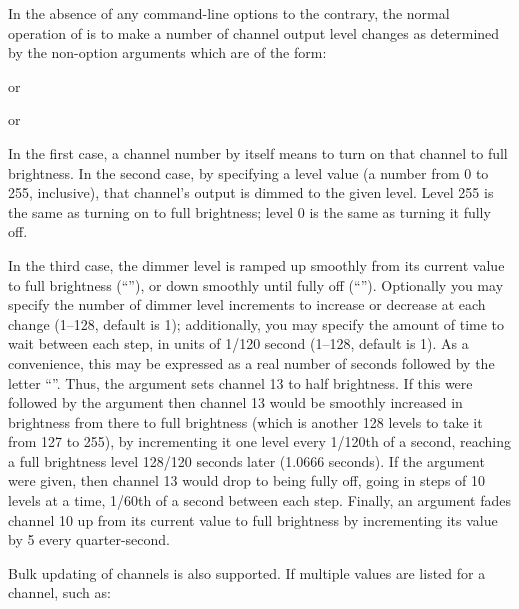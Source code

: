 In the absence of any command-line options to the contrary, the
normal 
operation of
is to make a number of channel output level 
changes as determined by the non-option arguments which are of the
form:
\begin{center}
\end{center}
or
\begin{center}
\codetype{\textnormal{[},\textnormal{\dots ]}}
\end{center}
or
\begin{center}
\codetype{\textnormal{\{}u\textnormal{|}d\textnormal{\}[}:}\codetype{\textnormal{[}:}\codetype{\textnormal{]]}}
\end{center}


In the first case, a channel number by itself means to turn on that 
channel to full brightness.  In the second case, by specifying a level value
(a number from 0 to 255, inclusive), that channel's output is dimmed
to the given level.  Level 255 is the same as turning on to full 
brightness; level 0 is the same as turning it fully off.


In the third case, the dimmer level is ramped up smoothly from its current
value to full brightness 
(``''),
or down smoothly until fully off
(``'').
Optionally you may specify the number of dimmer level increments
to increase or decrease at each change (1--128, default is 1); additionally,
you may specify the amount of time to wait between each step, in units
of 1/120 second (1--128, default is 1).  As a convenience, this may be
expressed as a real number of seconds followed by the letter 
``''.
Thus, the argument
sets channel 13 to half brightness.  If this were followed by the argument
then channel 13 would be smoothly increased in brightness from there to full
brightness (which is another 128 levels to take it from 127 to 255), 
by incrementing it one level every 1/120th of a second, reaching a full
brightness level 128/120 seconds later (1.0666 seconds).  If the 
argument
were given, then channel 13 would drop to being fully off, going in steps
of 10 levels at a time, 1/60th of a second between each step.
Finally, an argument
fades channel 10 up from its current value to full brightness by incrementing
its value by 5 every quarter-second.


Bulk updating of channels is also supported.  If multiple values are listed
for a channel, such as:


